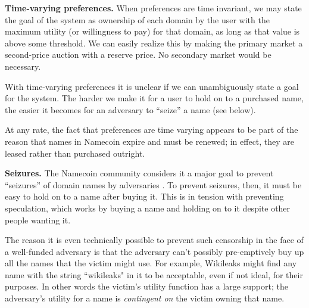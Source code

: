 {\bf Time-varying preferences.} When preferences are time invariant, we may state the goal of the system as ownership of each domain by the user with the maximum utility (or willingness to pay) for that domain, as long as that value is above some threshold. We can easily realize this by making the primary market a second-price auction with a reserve price. No secondary market would be necessary. 


With time-varying preferences it is unclear if we can unambiguously state a goal for the system. The harder we make it for a user to hold on to a purchased name, the easier it becomes for an adversary to ``seize'' a name (see below).

At any rate, the fact that preferences are time varying appears to be part of the reason that names in Namecoin expire and must be renewed; in effect, they are leased rather than purchased outright.

{\bf Seizures.} The Namecoin community considers it a major goal to prevent ``seizures'' of domain names by adversaries \cite{}. To prevent seizures, then, it must be easy to hold on to a name after buying it. This is in tension with preventing speculation, which works by buying a name and holding on to it despite other people wanting it.

The reason it is even technically possible to prevent such censorship in the face of a well-funded adversary is that the adversary can't possibly pre-emptively buy up all the names that the victim might use. For example, Wikileaks might find any name with the string ``wikileaks" in it to be acceptable, even if not ideal, for their purposes. In other words the victim's utility function has a large support; the adversary's utility for a name is {\em contingent on} the victim owning that name.








